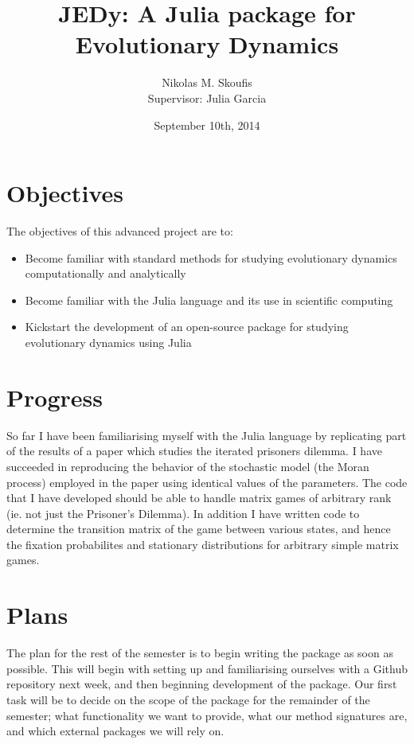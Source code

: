 \documentclass[a4paper,11pt]{article}
\begin{document}
\title{JEDy: A Julia package for Evolutionary Dynamics}
\author{Nikolas M. Skoufis \\ Supervisor: Julia Garcia}
\date{September 10th, 2014}

\maketitle

\section*{Objectives}

The objectives of this advanced project are to:

\begin{itemize}
        
    \item Become familiar with standard methods for studying evolutionary dynamics computationally and analytically
    \item Become familiar with the Julia \cite{julia} language and its use in scientific computing
    \item Kickstart the development of an open-source package for studying evolutionary dynamics using Julia

\end{itemize}

\section*{Progress}

So far I have been familiarising myself with the Julia language by replicating part of the results of a paper \cite{imhofetal} which studies the iterated prisoners dilemma.
I have succeeded in reproducing the behavior of the stochastic model (the Moran process) employed in the paper using identical values of the parameters.
The code that I have developed should be able to handle matrix games of arbitrary rank (ie. not just the Prisoner's Dilemma).
In addition I have written code to determine the transition matrix of the game between various states, and hence the fixation probabilites and stationary distributions for arbitrary simple matrix games.

\section*{Plans}

The plan for the rest of the semester is to begin writing the package as soon as possible.
This will begin with setting up and familiarising ourselves with a Github repository next week, and then beginning development of the package.
Our first task will be to decide on the scope of the package for the remainder of the semester; what functionality we want to provide, what our method signatures are, and which external packages we will rely on.
\end{document}
